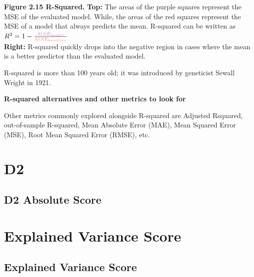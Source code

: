 \textbf{Figure 2.15 R-Squared.} \textbf{Top:} The
areas of the purple squares
represent the MSE of the
evaluated model. While, the areas
of the red squares represent the
MSE of a model that always
predicts the mean. R-squared
can be written as $R^2 = 1-\frac{\color{violet!50}MSE_{model}}{\color{red!50}MSE_{baseline}}$\\
\textbf{Right:} R-squared quickly drops
into the negative region in cases
where the mean is a better
predictor than the evaluated
model.


{
R-squared is more than 100 years old; it was introduced by geneticist Sewall Wright in 1921.
}


\textbf{R-squared alternatives and other metrics to look for}

Other metrics commonly explored alongside R-squared are Adjusted Rsquared, out-of-sample R-squared, Mean Absolute Error (MAE), Mean Squared Error (MSE), Root Mean Squared Error (RMSE), etc.



\clearpage
\thispagestyle{customstyle}
\section{D2}
\subsection{D2 Absolute Score}

\clearpage
\thispagestyle{customstyle}
\section{Explained Variance Score}
\subsection{Explained Variance Score}
